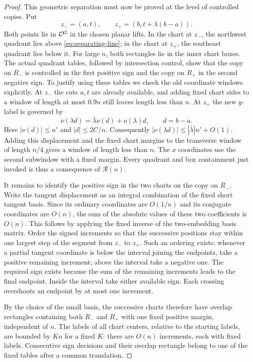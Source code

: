 \begin{proof}
This geometric separation must now be proved at the level of
controlled copies.  Put
\[
 z_-=(a,t),\qquad z_+=(b,t+\lambda(b-a)).
\]
Both points lie in $\mathcal O^2$ in the chosen planar lifts.
In the chart at $z_-$, the northwest quadrant lies above
\eqref{eq:separating-line}; in the chart at $z_+$, the southeast
quadrant lies below it.  For large $n$, both rectangles lie in
the inner chart boxes.  The actual quadrant tables, followed by
intersection control, show that the copy on $R_-$ is controlled
in the first positive sign and the copy on $R_+$ in the second
negative sign.  To justify using these tables we check the old
coordinate windows explicitly.  At $z_-$ the cuts $a,t$ are
already available, and adding fixed chart sides to a window of
length at most $0.9n$ still leaves length less than $n$.
At $z_+$ the new $y$-label is governed by
\begin{equation}\label{eq:label-contraction}
 \nu(\lambda d)=\bar\lambda\nu(d)+\nu(\lambda)d,
 \qquad d=b-a.
\end{equation}
Here $|\nu(d)|\le n'$ and $|d|\le2C/n$.
Consequently
$|\nu(\lambda d)|\le|\bar\lambda|n'+O(1)$.
Adding this displacement and the fixed chart margins to the
transverse window of length $n/4$ gives a window of length less
than $n$.  The $x$ coordinates use the second subwindow with a
fixed margin.  Every quadrant and box containment just invoked
is thus a consequence of $\mathcal R(n)$.

It remains to identify the positive sign in the two charts on the
copy on $R_-$.  Write the tangent displacement as an integral
combination of the fixed short tangent basis.  Since its ordinary
coordinates are $O(1/n)$ and its conjugate coordinates are $O(n)$,
the sum of the absolute values of these two coefficients is
$O(n)$.  This follows by applying the fixed inverse of the
two-embedding basis matrix.  Order the signed increments so that
the successive positions stay within one largest step of the
segment from $z_-$ to $z_+$.  Such an ordering exists: whenever a
partial tangent coordinate is below the interval joining the
endpoints, take a positive remaining increment; above the interval
take a negative one.  The required sign exists because the sum of
the remaining increments leads to the final endpoint.  Inside the
interval take either available sign.  Each crossing overshoots an
endpoint by at most one increment.

By the choice of the small basis, the successive charts therefore
have overlap rectangles containing both $R_-$ and $R_+$ with
one fixed positive margin, independent of $n$.  The labels of all
chart centers, relative to the starting labels, are bounded by
$Kn$ for a fixed $K$: there are $O(n)$ increments, each with
fixed labels.  Consecutive sign decisions and their overlap
rectangle belong to one of the fixed tables after a common
translation.


\end{proof}
